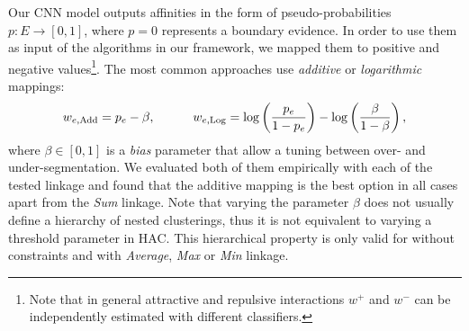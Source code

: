 Our CNN model outputs affinities in the form of pseudo-probabilities $p:E \rightarrow [0,1]$, where $p=0$ represents a boundary evidence. In order to use them as input of the algorithms in our framework, we mapped them to positive and negative values\footnote{Note that in general attractive and repulsive interactions $w^+$ and $w^-$ can be independently estimated with different classifiers.}. The most common approaches use \emph{additive} \cite{ailon2008aggregating} or \emph{logarithmic} \cite{finkel2008enforcing,andres2012globally} mappings:
\begin{equation} \label{eq:mappings}
w_{e,\mathrm{Add}} = p_e - \beta, \qquad \quad w_{e,\mathrm{Log}} = \log \left( \frac{p_e}{1-p_e} \right) - \log \left( \frac{\beta}{1-\beta} \right),
\end{equation}
where $\beta \in [0,1]$ is a \emph{bias} parameter that allow a tuning between over- and under-segmentation. We evaluated both of them empirically with each of the tested linkage and found that the additive mapping is the best option in all cases apart from the \emph{Sum} linkage. Note that varying the parameter $\beta$ does not usually define a hierarchy of nested clusterings, thus it is not equivalent to varying a threshold parameter in HAC. This hierarchical property is only valid for \algname{} without constraints and with \emph{Average}, \emph{Max} or \emph{Min} linkage.
